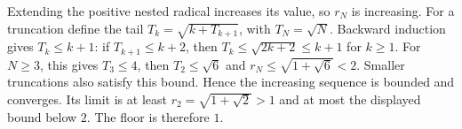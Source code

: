 Extending the positive nested radical increases its value, so $r_N$ is increasing. For a truncation define the tail $T_k=\sqrt{k+T_{k+1}}$, with $T_N=\sqrt N$. Backward induction gives $T_k\le k+1$: if $T_{k+1}\le k+2$, then $T_k\le\sqrt{2k+2}\le k+1$ for $k\ge1$. For $N\ge3$, this gives $T_3\le4$, then $T_2\le\sqrt6$ and $r_N\le\sqrt{1+\sqrt6}<2$. Smaller truncations also satisfy this bound. Hence the increasing sequence is bounded and converges. Its limit is at least $r_2=\sqrt{1+\sqrt2}>1$ and at most the displayed bound below $2$. The floor is therefore $\boxed1$.
